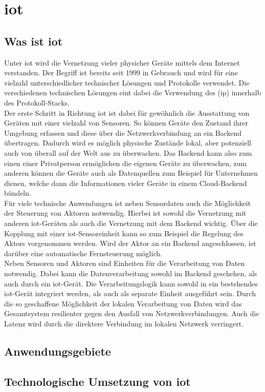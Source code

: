 \chapter{\acrfull{iot}}\label{ch:3}
\section{Was ist \acrshort{iot}}\label{sec:3.1}
Unter \acrshort{iot} wird die Vernetzung vieler physicher Geräte mittels dem Internet verstanden. Der Begriff ist bereits seit 1999 in Gebrauch\cite*[]{IARJSET} und wird für eine vielzahl unterschiedlicher technischer Lösungen und Protokolle verwendet. Die verschiedenen technischen Lösungen eint dabei die Verwendung des  (\acrshort{ip}) innerhalb des \Gls{Protokoll-Stack}s\cite*[]{Rayes2019}.\\ Der erste Schritt in Richtung \acrshort{iot} ist dabei für gewöhnlich die Ausstattung von Geräten mit einer vielzahl von Sensoren. So können Geräte den Zustand ihrer Umgebung erfassen und diese über die Netzwerkverbindung an ein \Gls{Backend} übertragen. Dadurch wird es möglich physische Zustände lokal, aber potenziell auch von überall auf der Welt aus zu überwachen. Das Backend kann also zum einen einer Privatperson ermöglichen die eigenen Geräte zu überwachen, zum anderen können die Geräte auch als Datenquellen zum Beispiel für Unternehmen dienen, welche dann die Informationen vieler Geräte in einem \Gls{Cloud}-\Gls{Backend} bündeln\cite*[]{inproceedings}.\\ Für viele technische Anwendungen ist neben Sensordaten auch die Möglichkeit der Steuerung von Aktoren notwendig. Hierbei ist sowohl die Vernetzung mit anderen \acrshort{iot}-Geräten als auch die Vernetzung mit dem \Gls{Backend} wichtig. Über die Kopplung mit einer \acrshort{iot}-Sensoreinheit kann so zum Beispiel die Regelung des Aktors vorgenommen werden. Wird der Aktor an ein Backend angeschlossen, ist darüber eine automatische Fernsteuerung möglich.\\ Neben Sensoren und Aktoren sind Einheiten für die Verarbeitung von Daten notwendig. Dabei kann die Datenverarbeitung sowohl im \Gls{Backend} geschehen, als auch durch ein \acrshort{iot}-Gerät. Die Verarbeitungslogik kann sowohl in ein bestehendes \acrshort{iot}-Gerät integriert werden, als auch als separate Einheit ausgeführt sein. Durch die so geschaffene Möglichkeit der lokalen Verarbeitung von Daten wird das Gesamtsystem resilienter gegen den Ausfall von Netzwerkverbindungen. Auch die Latenz wird durch die direktere Verbindung im lokalen Netzwerk verringert.
\section{Anwendungsgebiete}\label{sec:3.2}
\section{Technologische Umsetzung von \acrshort{iot}}\label{sec:3.3}